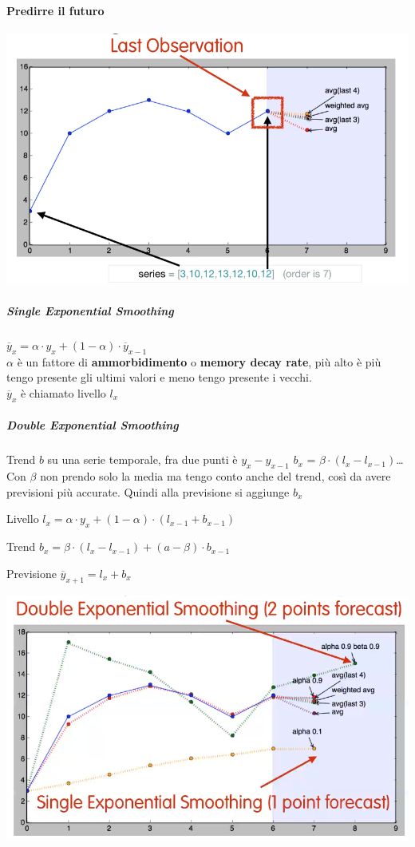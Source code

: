 \documentclass[10pt]{book}
\begin{document}
\paragraph{Predirre il futuro}
\begin{center}
	\includegraphics[scale=0.7]{averageforectast.png}
\end{center}
\subparagraph{Single Exponential Smoothing}
$\overline{y}_x = \alpha\cdot y_x + (1 - \alpha) \cdot \overline{y}_{x-1}$\\
$\alpha$ è un fattore di \textbf{ammorbidimento} o \textbf{memory decay rate}, più alto è più tengo presente gli ultimi valori e meno tengo presente i vecchi.\\
$\overline{y}_x$ è chiamato livello $l_x$
\subparagraph{Double Exponential Smoothing}
Trend $b$ su una serie temporale, fra due punti è $y_x - y_{x-1}$
$b_x$ = $\beta\cdot(l_x - l_{x-1})$\ldots\\
Con $\beta$ non prendo solo la media ma tengo conto anche del trend, così da avere previsioni più accurate. Quindi alla previsione si aggiunge $b_x$
\begin{list}{}{}
	\item Livello $l_x = \alpha\cdot y_x + (1-\alpha)\cdot(l_{x-1}+b_{x-1})$
	\item Trend $b_x = \beta\cdot(l_x - l_{x-1}) + (a-\beta)\cdot b_{x-1}$
	\item Previsione $\overline{y}_{x+1} = l_x + b_x$
\end{list}
\begin{center}
	\includegraphics[scale=0.7]{doubexpsmo.png}
\end{center}
\end{document}
